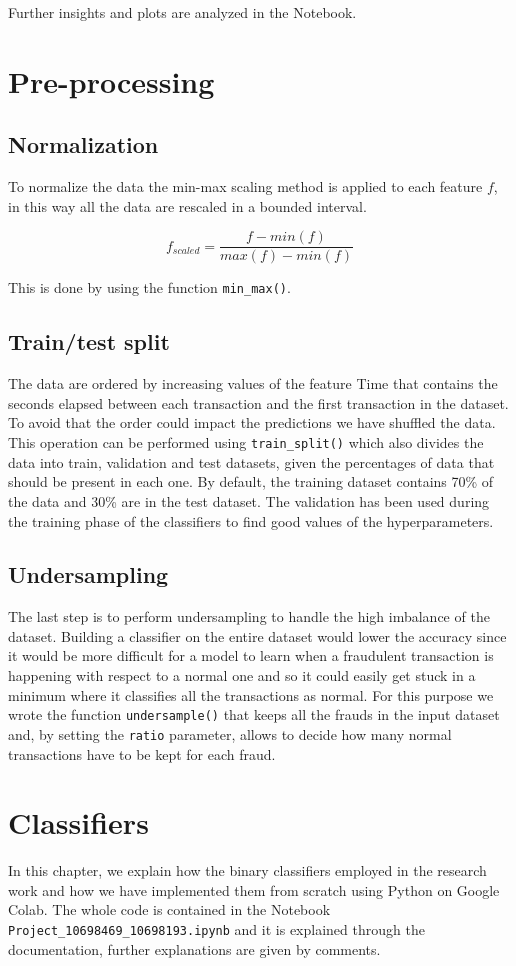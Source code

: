 \documentclass{Configuration_Files/PoliMi3i_thesis}
\begin{document}
Further insights and plots are analyzed in the Notebook.

\chapter{Pre-processing}
\section{Normalization}
To normalize the data the min-max scaling method is applied to each feature $f$, in this way all the data are rescaled in a bounded interval.

$$f_{scaled} = \frac{f - min(f)}{max(f) - min(f)}$$

This is done by using the function \verb|min_max()|.

\section{Train/test split}
The data are ordered by increasing values of the feature \textsf{Time} that contains the seconds elapsed between each transaction and the first transaction in the dataset. To avoid that the order could impact the predictions we have shuffled the data. This operation can be performed using \verb|train_split()| which also divides the data into train, validation and test datasets, given the percentages of data that should be present in each one. By default, the training dataset contains 70\% of the data and 30\% are in the test dataset. The validation has been used during the training phase of the classifiers to find good values of the hyperparameters.

\section{Undersampling}
The last step is to perform undersampling to handle the high imbalance of the dataset. Building a classifier on the entire dataset would lower the accuracy since it would be more difficult for a model to learn when a fraudulent transaction is happening with respect to a normal one and so it could easily get stuck in a minimum where it classifies all the transactions as normal. For this purpose we wrote the function \verb|undersample()| that keeps all the frauds in the input dataset and, by setting the \verb|ratio| parameter, allows to decide how many normal transactions have to be kept for each fraud.

\chapter{Classifiers}
In this chapter, we explain how the binary classifiers employed in the research work and how we have implemented them from scratch using Python on Google Colab.
The whole code is contained in the Notebook \verb|Project_10698469_10698193.ipynb| and it is explained through the documentation, further explanations are given by comments.
\end{document}
